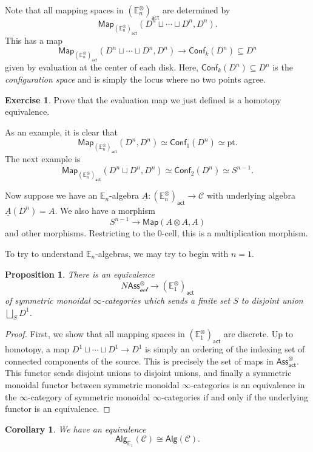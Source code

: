 \documentclass[10pt, oneside]{memoir}
\newtheorem{cor}[thm]{Corollary}
\newtheorem{prop}[thm]{Proposition}
\theoremstyle{definition}
\newtheorem{exer}[thm]{Exercise}
\theoremstyle{remark}
\theoremstyle{plain}
\theoremstyle{definition}
\theoremstyle{remark}
\newcommand{\E}{\mathbb{E}}
\newcommand{\mc}[1]{\mathcal{#1}}
\newcommand{\mr}[1]{\mathrm{#1}}
\newcommand{\ms}[1]{\mathsf{#1}}
\newcommand{\ul}[1]{\underline{#1}}
\newcommand{\1}{\mathbf{1}}
\newcommand{\2}{\mathbf{2}}
\newcommand{\3}{\mathbf{3}}
\newcommand{\pt}{\mr{pt}}
\begin{document}
Note that all mapping spaces in \((\E_n^{\otimes})_{\ms{act}} \) are determined by
\[ \ms{Map}_{(\E_n^{\otimes})_{\ms{act}}} (D^n \sqcup \cdots \sqcup D^n, D^n). \]
This has a map
\[ \ms{Map}_{(\E_n^{\otimes})_{\ms{act}}} (D^n \sqcup \cdots \sqcup D^n, D^n) \to \ms{Conf}_k (D^n) \subseteq D^n \]
given by evaluation at the center of each disk. Here, \(\ms{Conf}_k(D^n) \subseteq D^n \) is the \textit{configuration space} and is simply the locus where no two points agree.

\begin{exer}
    Prove that the evaluation map we just defined is a homotopy equivalence.
\end{exer}

As an example, it is clear that
\[ \ms{Map}_{(\E_n^{\otimes})_{\ms{act}}} (D^n, D^n) \simeq \ms{Conf}_1 (D^n) \simeq \pt. \]
The next example is
\[ \ms{Map}_{(\E_n^{\otimes})_{\ms{act}}} (D^n \sqcup D^n, D^n) \simeq \ms{Conf}_2 (D^n) \simeq S^{n-1}. \]

Now suppose we have an \(\E_n \)-algebra \(\ul{A} \colon (\E_n^{\otimes})_{\ms{act}} \to \mc{C} \) with underlying algebra \(\ul{A}(D^n) = A \). We also have a morphism
\[ S^{n-1} \to \ms{Map}(A \otimes A, A) \]
and other morphisms. Restricting to the \(0 \)-cell, this is a multiplication morphism.

To try to understand \(\E_n \)-algebras, we may try to begin with \(n=1 \).
\begin{prop}
    There is an equivalence
    \[ N\ms{Ass}_{\mc{act}}^{\otimes} \to (\E_1^{\otimes})_{\ms{act}} \]
    of symmetric monoidal \(\infty \)-categories which sends a finite set \(S \) to disjoint union \(\bigsqcup_S D^1 \).
\end{prop}

\begin{proof}
    First, we show that all mapping spaces in \((\E_1^{\otimes})_{\ms{act}} \) are discrete. Up to homotopy, a map \(D^1 \sqcup \cdots \sqcup D^1 \to D^1 \) is simply an ordering of the indexing set of connected components of the source. This is precisely the set of maps in \(\ms{Ass}_{\ms{act}}^{\otimes} \). This functor sends disjoint unions to disjoint unions, and finally a symmetric monoidal functor between symmetric monoidal \(\infty \)-categories is an equivalence in the \(\infty \)-category of symmetric monoidal \(\infty \)-categories if and only if the underlying functor is an equivalence.
\end{proof}

\begin{cor}
    We have an equivalence
    \[ \ms{Alg}_{\E_1}(\mc{C}) \cong \ms{Alg}(\mc{C}). \]
\end{cor}
\end{document}
